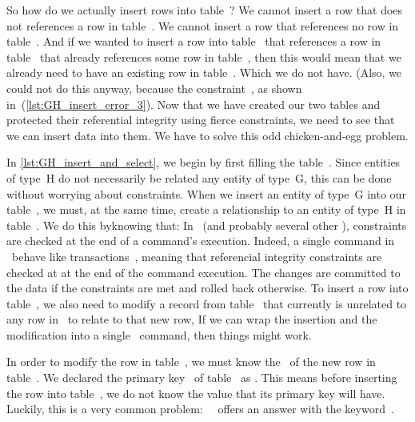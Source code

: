 So how do we actually insert rows into table~?
We cannot insert a row that does not references a row in table~.
We cannot insert a row that references no row in table~.
And if we wanted to insert a row into table~ that references a row in table~ that already references some row in table~, then this would mean that we already need to have an existing row in table~.
Which we do not have.
(Also, we could not do this anyway, because the constraint~, as shown in~(\cref{lst:GH_insert_error_3}).
Now that we have created our two tables and protected their referential integrity using fierce constraints, we need to see that we can insert data into them.
We have to solve this odd chicken-and-egg problem.

In \cref{lst:GH_insert_and_select}, we begin by first filling the table~.
Since entities of type~H do not necessarily be related any entity of type~G, this can be done without worrying about constraints.
When we insert an entity of type~G into our table~, we must, at the same time, create a relationship to an entity of type~H in table~.
We do this byknowing that:%
%
%
%
In \postgresql~(and probably several other ), constraints are checked at the end of a command's execution.
Indeed, a single command in \postgresql\ behave like transactions~\cite{PGDG:T}, meaning that referencial integrity constraints are checked at at the end of the command execution.
The changes are committed to the data if the constraints are met and rolled back otherwise.
To insert a row into table~, we also need to modify a record from table~ that currently is unrelated to any row in~ to relate to that new row,
If we can wrap the insertion and the modification into a single \sql\ command, then things might work.%

In order to modify the row in table~, we must know the~ of the new row in table~.
We declared the primary key~ of table~ as .
This means before inserting the row into table~, we do not know the value that its primary key will have.
Luckily, this is a very common problem:~
\sql\ offers an answer with the  keyword~\cite{PGDG:PD:RDFMR}.

